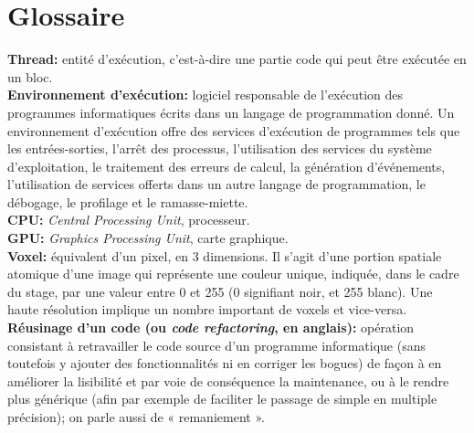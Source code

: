 \documentclass[10pt]{report}
\begin{document}
\chapter*{Glossaire}
\noindent 
\textbf{Thread:} entité d'exécution, c'est-à-dire une partie code qui peut être exécutée en un bloc. \vspace{2cm} 
\textbf{\\Environnement d'exécution:}  logiciel responsable de l'exécution des programmes informatiques écrits dans un langage de programmation donné. Un environnement d'exécution offre des services d'exécution de programmes tels que les entrées-sorties, l'arrêt des processus, l'utilisation des services du système d'exploitation, le traitement des erreurs de calcul, la génération d'événements, l'utilisation de services offerts dans un autre langage de programmation, le débogage, le profilage et le ramasse-miette.\vspace{2cm} 
\textbf{\\CPU:} \textit{Central Processing Unit}, processeur. \vspace{2cm}
\textbf{\\GPU:} \textit{Graphics Processing Unit}, carte graphique.  \vspace{2cm}
\textbf{\\Voxel:} équivalent d'un pixel, en 3 dimensions. Il s'agit d'une portion spatiale atomique d'une image qui représente une couleur unique, indiquée, dans le cadre du stage, par une valeur entre 0 et 255 (0 signifiant noir, et 255 blanc). Une haute résolution implique un nombre important de voxels et vice-versa.  \vspace{2cm}
\textbf{\\Réusinage d'un code (ou \textit{code refactoring}, en anglais):} opération consistant à retravailler le code source d'un programme informatique (sans toutefois y ajouter des fonctionnalités ni en corriger les bogues) de façon à en améliorer la lisibilité et par voie de conséquence la maintenance, ou à le rendre plus générique (afin par exemple de faciliter le passage de simple en multiple précision); on parle aussi de « remaniement ». \\


\end{document}
